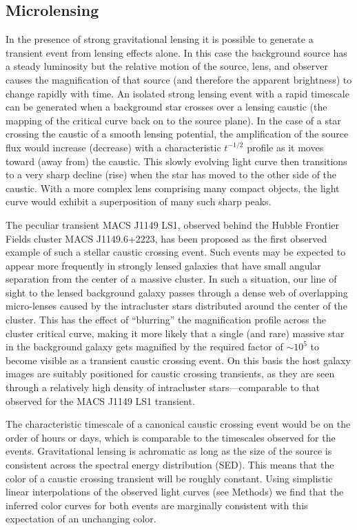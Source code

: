 \subsection{Microlensing}\label{sec:MicroLensing}

In the presence of strong gravitational lensing it is possible to
generate a transient event from lensing effects alone.  In this case
the background source has a steady luminosity but the relative motion
of the source, lens, and observer causes the magnification of that
source (and therefore the apparent brightness) to change rapidly with
time.  An isolated strong lensing event with a rapid timescale can be
generated when a background star crosses over a lensing caustic (the
mapping of the critical curve back on to the source plane).  In the
case of a star crossing the caustic of a smooth lensing potential, the
amplification of the source flux would increase (decrease) with a
characteristic $t^{-1/2}$ profile as it moves toward (away from) the
caustic. This slowly evolving light curve then transitions to a very
sharp decline (rise) when the star has moved to the other side of the
caustic\cite{Schneider:1986, MiraldaEscude:1991}.  With a more complex
lens comprising many compact objects, the light curve would exhibit a
superposition of many such sharp peaks\cite{Lewis:1993}.

The peculiar transient MACS J1149 LS1, observed behind the Hubble
Frontier Fields cluster MACS J1149.6+2223, has been proposed as the
first observed example of such a stellar caustic crossing
event\cite{Kelly:2017}. Such events may be
expected to appear more frequently in strongly lensed galaxies that
have small angular separation from the center of a massive cluster. In
such a situation, our line of sight to the lensed background galaxy
passes through a dense web of overlapping micro-lenses caused by the
intracluster stars distributed around the center of the cluster. This
has the effect of ``blurring'' the magnification profile across the
cluster critical curve, making it more likely that a single (and rare)
massive star in the background galaxy gets magnified by the required
factor of $\sim10^5$ to become visible as a transient caustic crossing
event.  On this basis the \spock host galaxy images are suitably
positioned for caustic crossing transients, as they are seen through a
relatively high density of intracluster stars---comparable to that
observed for the MACS J1149 LS1 transient.

The characteristic timescale of a canonical caustic crossing event
would be on the order of hours or days, which is comparable to the
timescales observed for the \spock events. Gravitational lensing is
achromatic as long as the size of the source is consistent across the
spectral energy distribution (SED).  This means that the color of a
caustic crossing transient will be roughly constant.  Using simplistic
linear interpolations of the observed light curves (see Methods) we
find that the inferred color curves for both \spock events are
marginally consistent with this expectation of an unchanging color.

